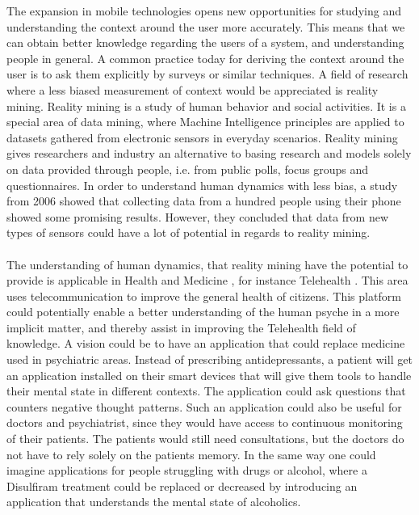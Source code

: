 
The expansion in mobile technologies opens new opportunities for studying and understanding the context around the user more accurately. This means that we can obtain better knowledge regarding the users of a system, and understanding people in general. A common practice today for deriving the context around the user is to ask them explicitly by surveys or similar techniques. A field of research where a less biased measurement of context would be appreciated is reality mining. Reality mining is a study of human behavior and social activities. It is a special area of data mining, where Machine Intelligence principles are applied to datasets gathered from electronic sensors in everyday scenarios. Reality mining gives researchers and industry an alternative to basing research and models solely on data provided through people, i.e. from public polls, focus groups and questionnaires. In order to understand human dynamics with less bias, a study from 2006 \parencite{eagle2006_reality_mining_definition} showed that collecting data from a hundred people using their phone showed some promising results. However, they concluded that data from new types of sensors could have a lot of potential in regards to reality mining. 
\\\\
The understanding of human dynamics, that reality mining have the potential to provide is applicable in Health and Medicine \parencite{pentland2009_reality_mining_health_medicine}, for instance Telehealth \parencite{telehealth_aau}. This area uses telecommunication to improve the general health of citizens. This platform could potentially enable a better understanding of the human psyche in a more implicit matter, and thereby assist in improving the Telehealth field of knowledge. A vision could be to have an application that could replace medicine used in psychiatric areas. Instead of prescribing antidepressants, a patient will get an application installed on their smart devices that will give them tools to handle their mental state in different contexts. The application could ask questions that counters negative thought patterns. Such an application could also be useful for doctors and psychiatrist, since they would have access to continuous monitoring of their patients. The patients would still need consultations, but the doctors do not have to rely solely on the patients memory. In the same way one could imagine applications for people struggling with drugs or alcohol, where a Disulfiram \parencite{nlm_disulfiram} treatment could be replaced or decreased by introducing an application that understands the mental state of alcoholics.
